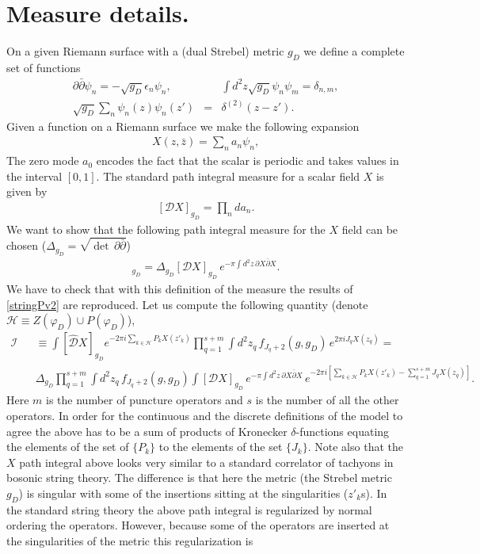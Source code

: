 \documentclass[11pt]{JHEP3}
\def\be{\begin{eqnarray}}
\def\ee{\end{eqnarray}}
\def\e{\epsilon}
\def\d{\partial}
\def\vf{\varphi}
\def\e{\epsilon}
\begin{document}
\section{Measure details.}\label{measure}


On a given Riemann surface with a (dual Strebel) metric $g_D$ we define a complete set of functions
\be\label{defpsi}
\d\bar\d \psi_n=-\sqrt{g_D} \e_n\psi_n,\qquad&&\int d^2z\sqrt{g_D}\psi_n\psi_m=\delta_{n,m},\\
\sqrt{g_D}\sum_n\psi_n(z)\psi_n(z')&=&\delta^{(2)}(z-z').
\nonumber
\ee
Given a function on a Riemann surface we make the following expansion
\be
X(z,\bar z)=\sum_n a_n\psi_n,
\ee   The zero mode $a_0$ encodes the fact that the scalar is periodic
and takes values in the interval $[0,1]$. The standard path integral measure for a scalar field  $X$ is given by
\be\label{standmeas}
[{\mathcal D}X]_{g_D}=\prod_n da_n.
\ee We want to show that the following path integral measure for the $X$ field can be chosen ($\Delta_{g_D}=\sqrt{\det\,\d\bar\d}$)
\be
[\hat{\mathcal D}X]_{g_D}=\Delta_{g_D}[{\mathcal D}X]_{g_D}\,e^{-\pi\int d^2z\,\d X\bar\d X}.
\ee We have to check that with this definition of the measure  the results of \eqref{stringPv2} are reproduced.
Let us compute the following quantity (denote ${\mathcal H}\equiv Z(\vf_D)\cup P(\vf_D)$),
\be\label{meascond2}
{\mathcal I}&&\equiv\int [\hat{\mathcal D}X]_{g_D} e^{-2\pi i \sum_{k\in {\mathcal H}}P_k X(z'_k)}
\prod_{q=1}^{s+m}\int d^2z_q\,f_{J_q+2}(g,g_D)\,e^{2\pi i J_q X(z_q)}=\\
&&\Delta_{g_D}\prod_{q=1}^{s+m}\int d^2z_q\,f_{J_q+2}(g,g_D)\int [{\mathcal D}X]_{g_D}\,e^{-\pi\int d^2z\,\d X\bar\d X}\, e^{-2\pi i \left[\sum_{k\in {\mathcal H}}P_k X(z'_k)
-\sum_{q=1}^{s+m}J_q X(z_q)\right]}.\nonumber
\ee Here $m$ is the number of puncture operators and $s$ is the number of all the other
operators. In order for the continuous and the discrete definitions of the model to agree the above has to be a sum of products of Kronecker
$\delta$-functions equating the elements of the set of $\{P_k\}$ to the elements of the set $\{J_k\}$. Note also that the $X$ path integral
above looks very similar to a standard correlator of tachyons in bosonic string theory. The difference is that here  the metric (the Strebel metric $g_D$) is singular with some of the insertions sitting at the singularities ($z'_k$s). In the standard string theory the above path integral is regularized by
normal ordering the operators. However, because  some of the operators are inserted at the singularities of the metric this regularization is
\end{document}
